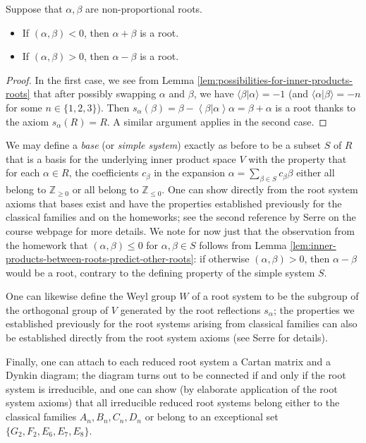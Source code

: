 \documentclass[reqno]{amsart} 
\begin{document}
\begin{lemma}
  \label{lem:inner-products-between-roots-predict-other-roots}
  Suppose that $\alpha,\beta$ are non-proportional roots.
  \begin{itemize}
  \item If $(\alpha,\beta) < 0$, then $\alpha + \beta$ is a root.
  \item If $(\alpha,\beta) > 0$, then $\alpha - \beta$ is a root.
  \end{itemize}
\end{lemma}
\begin{proof}
  In the first case, we see from Lemma \ref{lem:possibilities-for-inner-products-roots} that after possibly swapping $\alpha$ and $\beta$, we have $\langle \beta |\alpha \rangle = -1$ (and $\langle \alpha | \beta \rangle = - n$ for some $n \in \{1,2,3\}$).  Then $s_\alpha(\beta) = \beta - \left\langle \beta | \alpha \right\rangle \alpha = \beta + \alpha$ is a root thanks to the axiom $s_\alpha(R) = R$.  A similar argument applies in the second case.
\end{proof}

We may define a \emph{base} (or \emph{simple system}) exactly as before to be a subset $S$ of $R$ that is a basis for the underlying inner product space $V$ with the property that for each $\alpha \in R$, the coefficients $c_\beta$ in the expansion $\alpha = \sum_{\beta \in S} c_\beta \beta$ either all belong to $\mathbb{Z}_{\geq 0}$ or all belong to $\mathbb{Z}_{\leq 0}$.  One can show directly from the root system axioms that bases exist and have the properties established previously for the classical families and on the homeworks; see the second reference by Serre on the course webpage for more details.  We note for now just that the observation from the homework that $(\alpha,\beta) \leq 0$ for $\alpha,\beta \in S$ follows from Lemma \ref{lem:inner-products-between-roots-predict-other-roots}: if otherwise $(\alpha,\beta) > 0$, then $\alpha - \beta$ would be a root, contrary to the defining property of the simple system $S$.

One can likewise define the Weyl group $W$ of a root system to be the subgroup of the orthogonal group of $V$ generated by the root reflections $s_\alpha$; the properties we established previously for the root systems arising from classical families can also be established directly from the root system axioms (see Serre for details).

Finally, one can attach to each reduced root system a Cartan matrix and a Dynkin diagram; the diagram turns out to be connected if and only if the root system is irreducible, and one can show (by elaborate application of the root system axioms) that all irreducible reduced root systems belong either to the classical families $A_n, B_n, C_n, D_n$ or belong to an exceptional set $\{G_2,F_2,E_6,E_7,E_8\}$.
\end{document}
